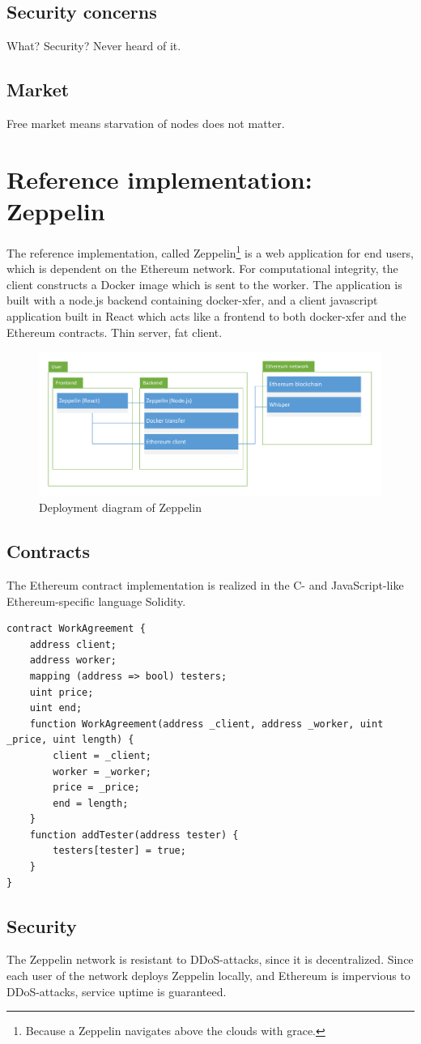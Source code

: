 \subsection{Security concerns}
What? Security? Never heard of it.

\subsection{Market}
Free market means starvation of nodes does not matter.

\section{Reference implementation: Zeppelin}
The reference implementation, called Zeppelin\footnote{Because a Zeppelin navigates above the clouds with grace.} is a web application for end users, which is dependent on the Ethereum network. For computational integrity, the client constructs a Docker image which is sent to the worker. The application is built with a node.js backend containing docker-xfer, and a client javascript application built in React which acts like a frontend to both docker-xfer and the Ethereum contracts. Thin server, fat client.

\begin{figure}[H]
\centering
\includegraphics[width=0.80\linewidth, trim=3cm 1cm 3cm 1cm]{figure/deployment.pdf}
\caption{Deployment diagram of Zeppelin}
\end{figure}

\subsection{Contracts}
The Ethereum contract implementation is realized in the C- and JavaScript-like Ethereum-specific language Solidity.
\begin{lstlisting}[caption={WorkAgreement contract}, label={lst:workagreement}]
contract WorkAgreement {
    address client;
    address worker;
    mapping (address => bool) testers;
    uint price;
    uint end;
    function WorkAgreement(address _client, address _worker, uint _price, uint length) {
        client = _client;
        worker = _worker;
        price = _price;
        end = length;
    }
    function addTester(address tester) {
        testers[tester] = true;
    }
}
\end{lstlisting}

\subsection{Security}
The Zeppelin network is resistant to DDoS-attacks, since it is decentralized. Since each user of the network deploys Zeppelin locally, and Ethereum is impervious to DDoS-attacks, service uptime is guaranteed. 
